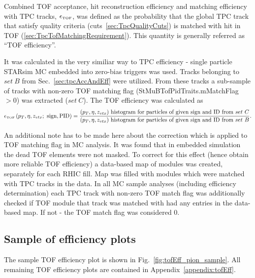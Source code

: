 Combined TOF acceptance, hit reconstruction efficiency and matching efficiency with TPC tracks, $\epsilon_{\textrm{\tiny TOF}}$, was defined as the probability that the global TPC track that satisfy quality criteria (cuts~\ref{sec:TpcQualityCuts}) is matched with hit in TOF (\ref{sec:TpcTofMatchingRequirement}). This quantity is generally referred as ``TOF efficiency''.

It was calculated in the very similiar way to TPC efficiency - single particle STARsim MC embedded into zero-bias triggers was used. Tracks belonging to $set~B$ from Sec.~\ref{sec:tpcAccAndEff} were utilized. From these tracks a sub-sample of tracks with non-zero TOF matching flag (StMuBTofPidTraits.mMatchFlag $>0$) was extracted ($set~C$). The TOF efficiency was calculated as
\begin{equation}\label{eq:tofAccAndEffDefinition}
		\epsilon_{\textrm{\tiny TOF}}\left(p_{T}, \eta, z_{vtx};~\textrm{sign},\textrm{PID}\right) = \frac{(p_{T},\eta, z_{vtx})~\textrm{histogram for particles of given sign and ID from}~set~C}{(p_{T},\eta, z_{vtx})~\textrm{histogram for particles of given sign and ID from}~set~B}.
	\end{equation}

An additional note has to be made here about the correction which is applied to TOF matching flag in MC analysis. It was found that in embedded simulation the dead TOF elements were not masked. To correct for this effect (hence obtain more reliable TOF efficiency) a data-based map of modules was created, separately for each RHIC fill. Map was filled with modules which were matched with TPC tracks in the data. In all MC sample analyses (including efficiency determination) each TPC track with non-zero TOF match flag was additionally checked if TOF module that track was matched with had any entries in the data-based map. If not - the TOF match flag was considered 0.

\subsection{Sample of  efficiency plots}

The sample TOF efficiency plot is shown in Fig.~\ref{fig:tofEff_pion_sample}. All remaining TOF efficiency plots are contained in Appendix~\ref{appendix:tofEff}.

